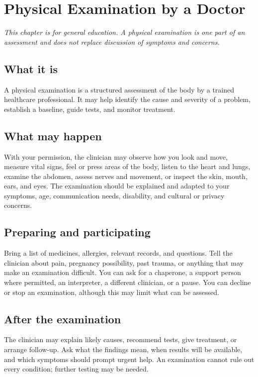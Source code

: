 \chapter{Physical Examination by a Doctor}

\medskip
\noindent\textit{This chapter is for general education. A physical examination is one part of an assessment and does not replace discussion of symptoms and concerns.}

\section*{What it is}
A physical examination is a structured assessment of the body by a trained healthcare professional. It may help identify the cause and severity of a problem, establish a baseline, guide tests, and monitor treatment.

\section*{What may happen}
With your permission, the clinician may observe how you look and move, measure vital signs, feel or press areas of the body, listen to the heart and lungs, examine the abdomen, assess nerves and movement, or inspect the skin, mouth, ears, and eyes. The examination should be explained and adapted to your symptoms, age, communication needs, disability, and cultural or privacy concerns.

\section*{Preparing and participating}
Bring a list of medicines, allergies, relevant records, and questions. Tell the clinician about pain, pregnancy possibility, past trauma, or anything that may make an examination difficult. You can ask for a chaperone, a support person where permitted, an interpreter, a different clinician, or a pause. You can decline or stop an examination, although this may limit what can be assessed.

\section*{After the examination}
The clinician may explain likely causes, recommend tests, give treatment, or arrange follow-up. Ask what the findings mean, when results will be available, and which symptoms should prompt urgent help. An examination cannot rule out every condition; further testing may be needed.

